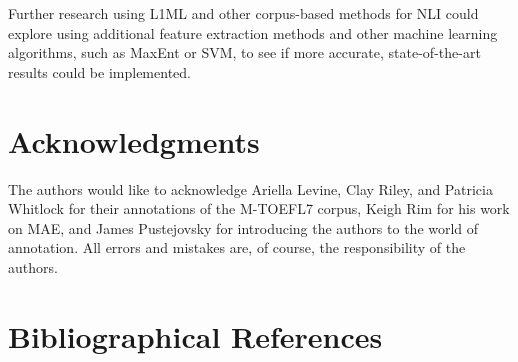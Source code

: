 \documentclass[10pt, a4paper]{article}
\begin{document}
Further research using L1ML and other corpus-based methods for NLI could explore using additional feature extraction methods and other machine learning algorithms, such as MaxEnt or SVM, to see if more accurate, state-of-the-art results could be implemented. 



\section*{Acknowledgments}
The authors would like to acknowledge Ariella Levine, Clay Riley, and Patricia Whitlock for their annotations of the M-TOEFL7 corpus, Keigh Rim for his work on MAE, and James Pustejovsky for introducing the authors to the world of annotation. All errors and mistakes are, of course, the responsibility of the authors.

\nocite{*}
\section{Bibliographical References}
\label{main:ref}



\end{document}
